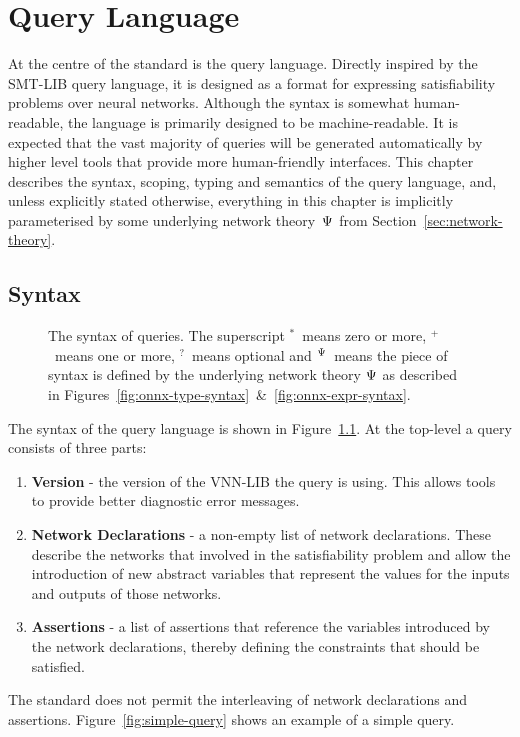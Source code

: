 \chapter{Query Language}
\label{sec:specification_language}

At the centre of the \vnnlib{} standard is the \vnnlib{} query language. Directly inspired by the SMT-LIB query language, it is designed as a format for expressing satisfiability problems over neural networks.
Although the syntax is somewhat human-readable, the language is primarily designed to be machine-readable. 
It is expected that the vast majority of \vnnlib{} queries will be generated automatically by higher level tools that provide more human-friendly interfaces.
This chapter describes the syntax, scoping, typing and semantics of the query language, and, unless explicitly stated otherwise, everything in this chapter is implicitly parameterised by some underlying network theory~$\Psi$ from Section~\ref{sec:network-theory}.

\section{Syntax}
\label{sec:syntax}

\begin{figure}
	\setlength{\grammarindent}{6.5em}
	
	\vspace{-1em}
    \caption{The syntax of \vnnlib{} queries. The superscript $^*$~means zero or more, $^+$~means one or more, $^?$~means optional and $^\Psi$~means the piece of syntax is defined by the underlying network theory $\Psi$ as described in Figures~\ref{fig:onnx-type-syntax}~\&~\ref{fig:onnx-expr-syntax}.}
    \label{fig:vnnlib-syntax}
\end{figure}

The syntax of the \vnnlib{} query language is shown in Figure~\ref{fig:vnnlib-syntax}. At the top-level a \vnnlib{} query consists of three parts: 
\begin{enumerate}
\item \textbf{Version} - the version of the VNN-LIB the query is using. This allows tools to provide better diagnostic error messages.
\item \textbf{Network Declarations} - a non-empty list of network declarations. These describe the networks that involved in the satisfiability problem and allow the introduction of new abstract variables that represent the values for the inputs and outputs of those networks.
\item \textbf{Assertions} - a list of assertions that reference the variables introduced by the network declarations, thereby defining the constraints that should be satisfied.
\end{enumerate}
The standard does not permit the interleaving of network declarations and assertions. Figure~\ref{fig:simple-query} shows an example of a simple query.


